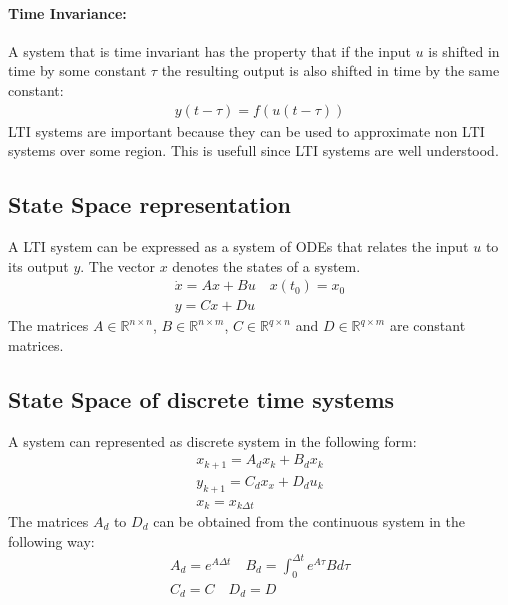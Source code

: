 \paragraph{Time Invariance:}
A system that is time invariant has the property that if the input \(u\) is shifted in time by some constant \(\tau\) the resulting output is also shifted in time by the same constant:
\begin{gather}
y(t - \tau) = f(u(t-\tau))
\end{gather}
LTI systems are important because they can be used to approximate non LTI systems over some region.
This is usefull since LTI systems are well understood.
\cite{DouglasB}
\subsection{State Space representation}
A LTI system can be expressed as a system of ODEs that relates the input \(u\) to its output \(y\).
The vector \(x\) denotes the states of a system.
\begin{gather}
\dot{x} = Ax + Bu \quad x(t_0) = x_0\\
y = Cx + Du
\end{gather}
The matrices \(A \in \mathbb{R}^{n \times n}\),
\(B \in \mathbb{R}^{n \times m}\),
\(C \in \mathbb{R}^{q \times n}\) and
\(D \in \mathbb{R}^{q \times m}\) are constant matrices.
\cite{BennerGrivet}
\subsection{State Space of discrete time systems}
A system can represented as discrete system in the following form:
\begin{gather}
x_{k+1} = A_dx_k + B_dx_k \label{disc-a} \\
y_{k+1} = C_dx_x + D_du_k \label{disc-b}\\
x_{k} = x_{k\Delta t}
\end{gather}
The matrices \(A_d\) to \(D_d\) can be obtained from the continuous system in the following way:
\begin{gather}
A_d = e^{A\Delta t} \quad B_d = \int_0^{\Delta t} e^{A\tau}B d\tau \\
C_d = C \quad D_d = D
\end{gather}
\cite{brunton_kutz_2019g}
